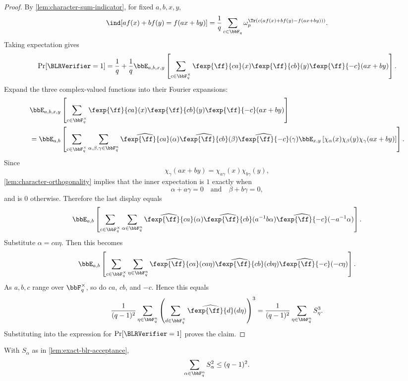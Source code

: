 \begin{proof}
By \cref{lem:character-sum-indicator}, for fixed $a,b,x,y$,
\[
    \ind[a f(x)+b f(y)=f(ax+by)]
    =\frac{1}{q}\sum_{c\in\bbF_q}
        \omega_p^{\Tr(c(a f(x)+b f(y)-f(ax+by)))}.
\]
Taking expectation gives
\[
    \Pr[\BLRVerifier=1]
    =\frac{1}{q}+\frac{1}{q}\bbE_{a,b,x,y}
        \left[\sum_{c\in\bbF_q^\times}
        \fexp{\ff}{ca}(x)\fexp{\ff}{cb}(y)
        \fexp{\ff}{-c}(ax+by)
        \right].
\]
Expand the three complex-valued functions into their Fourier expansions:
\begin{align*}
&\bbE_{a,b,x,y}
        \left[\sum_{c\in\bbF_q^\times}
        \fexp{\ff}{ca}(x)\fexp{\ff}{cb}(y)
        \fexp{\ff}{-c}(ax+by)
        \right] \\
&=\bbE_{a,b}\left[\sum_{c\in\bbF_q^\times}
    \sum_{\alpha,\beta,\gamma\in\bbF_q^n}
    \widehat{\fexp{\ff}{ca}}(\alpha)
    \widehat{\fexp{\ff}{cb}}(\beta)
    \widehat{\fexp{\ff}{-c}}(\gamma)
    \bbE_{x,y}\left[
        \chi_\alpha(x)\chi_\beta(y)\chi_\gamma(ax+by)
    \right]
\right].
\end{align*}
Since
\[
    \chi_\gamma(ax+by)=\chi_{a\gamma}(x)\chi_{b\gamma}(y),
\]
\cref{lem:character-orthogonality} implies that the inner expectation is $1$ exactly when
\[
    \alpha+a\gamma=0
    \quad\text{and}\quad
    \beta+b\gamma=0,
\]
and is $0$ otherwise. Therefore the last display equals
\[
    \bbE_{a,b}\left[\sum_{c\in\bbF_q^\times}
    \sum_{\alpha\in\bbF_q^n}
    \widehat{\fexp{\ff}{ca}}(\alpha)
    \widehat{\fexp{\ff}{cb}}(a^{-1}b\alpha)
    \widehat{\fexp{\ff}{-c}}(-a^{-1}\alpha)
    \right].
\]
Substitute $\alpha=ca\eta$. Then this becomes
\[
    \bbE_{a,b}\left[\sum_{c\in\bbF_q^\times}
    \sum_{\eta\in\bbF_q^n}
    \widehat{\fexp{\ff}{ca}}(ca\eta)
    \widehat{\fexp{\ff}{cb}}(cb\eta)
    \widehat{\fexp{\ff}{-c}}(-c\eta)
    \right].
\]
As $a,b,c$ range over $\bbF_q^\times$, so do $ca$, $cb$, and $-c$. Hence this equals
\[
    \frac{1}{(q-1)^2}
    \sum_{\eta\in\bbF_q^n}
    \left(\sum_{d\in\bbF_q^\times}
        \widehat{\fexp{\ff}{d}}(d\eta)
    \right)^3
    =\frac{1}{(q-1)^2}\sum_{\eta\in\bbF_q^n}S_\eta^3.
\]
Substituting into the expression for $\Pr[\BLRVerifier=1]$ proves the claim.
\end{proof}

\begin{lemma}
\label{lem:second-moment-bound}
With $S_\alpha$ as in \cref{lem:exact-blr-acceptance},
\[
    \sum_{\alpha\in\bbF_q^n} S_\alpha^2 \le (q-1)^2.
\]
\end{lemma}

